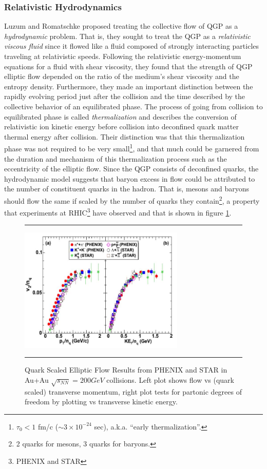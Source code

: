 \subsubsection{Relativistic Hydrodynamics}
Luzum and Romatschke \citep{PhysRevC.78.034915} proposed treating the collective flow of QGP as a \textit{hydrodynamic} problem. That is, they sought to treat the QGP as a \textit{relativistic viscous fluid} since it flowed like a fluid composed of strongly interacting particles traveling at relativistic speeds. Following the relativistic energy-momentum equations for a fluid with shear viscosity, they found that the strength of QGP elliptic flow depended on the ratio of the medium's shear viscosity and the entropy density. Furthermore, they made an important distinction between the rapidly evolving period just after the collision and the time described by the collective behavior of an equilibrated phase. The process of going from collision to equilibrated phase is called \textit{thermalization} and describes the conversion of relativistic ion kinetic energy before collision into deconfined quark matter thermal energy after collision. Their distinction was that this thermalization phase was not required to be very small\footnote{$\tau_0 < 1$ fm/c ($\sim 3 \times 10^{-24}$ sec), a.k.a. ``early thermalization''.}, and that much could be garnered from the duration and mechanism of this thermalization process such as the eccentricity of the elliptic flow. Since the QGP consists of deconfined quarks, the hydrodynamic model suggests that baryon excess in flow could be attributed to the number of constituent quarks in the hadron. That is, mesons and baryons should flow the same if scaled by the number of quarks they contain\footnote{2 quarks for mesons, 3 quarks for baryons.}, a property that experiments at RHIC\footnote{PHENIX and STAR} have observed and that is shown in figure \ref{fig:quarkscaledv2}.

\begin{figure}[htbp!]
  \centering    \rule{35em}{0.5pt}
    \includegraphics[width=0.7\textwidth]{prevplots/quarkscaledv2.JPG}

  \caption[Quark Scaled Elliptic Flow Results from PHENIX and STAR in Au+Au $\sqrt{s_NN}=200 GeV$ collisions]{Quark Scaled Elliptic Flow Results from PHENIX and STAR\citep{velkovska:lec12} in Au+Au $\sqrt{s_{NN}}=200 GeV$ collisions. Left plot shows flow vs (quark scaled) transverse momentum, right plot tests for partonic degrees of freedom by plotting vs transverse kinetic energy.}
  \label{fig:quarkscaledv2}    \rule{35em}{0.5pt}
\end{figure} 

